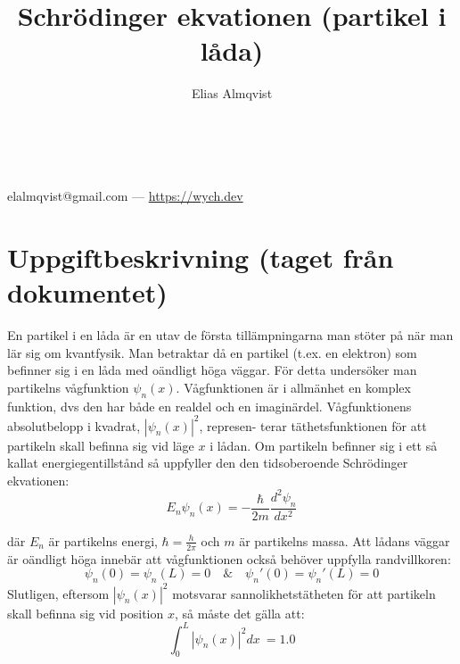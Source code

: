 \documentclass{article}
\makeatletter
\renewcommand{\maketitle}{
	\begin{center}
		{\huge\bfseries\thetitle}\\
		\vspace{1em}
		{\Large\theauthor} \\
		\vspace{1em}
		elalmqvist@gmail.com --- \url{https://wych.dev}
	\end{center}
}
\newcommand{\wavefun}{\psi_n(x)}
\newcommand{\shrodequ}{E_n \psi_n(x) = - \frac{\hbar}{2m} \frac{d^2 \psi_n}{dx^2}}
\newcommand{\shrodprob}{|\psi_n(x)|^2}
\makeatother
\begin{document}
\title{Schrödinger ekvationen (partikel i låda)}
\author{Elias Almqvist}

\maketitle
\newpage

\section{Uppgiftbeskrivning (taget från dokumentet)}
En partikel i en låda är en utav de första tillämpningarna man stöter på när man lär sig om kvantfysik. Man betraktar då en partikel (t.ex. en elektron) som befinner sig i en låda med oändligt höga väggar.
För detta undersöker man partikelns vågfunktion $\wavefun$. Vågfunktionen är i allmänhet en komplex funktion,
dvs den har både en realdel och en imaginärdel. Vågfunktionens absolutbelopp i kvadrat, $\shrodprob$, represen-
terar täthetsfunktionen för att partikeln skall befinna sig vid läge $x$ i lådan. Om partikeln befinner sig i ett så
kallat energiegentillstånd så uppfyller den den tidsoberoende Schrödinger ekvationen:
\begin{equation}
	\shrodequ
\end{equation}

där $E_n$ är partikelns energi, $\hbar = \frac{h}{2\pi}$ och $m$ är partikelns massa.
Att lådans väggar är oändligt höga innebär att vågfunktionen också behöver uppfylla randvillkoren:
$$
\psi_n(0) = \psi_n(L) = 0 \quad \& \quad \psi_n'(0) = \psi_n'(L) = 0 
$$
Slutligen, eftersom $\shrodprob$ motsvarar sannolikhetstätheten för att partikeln skall befinna sig vid position $x$, så måste det gälla att:
$$
\int_0^L \shrodprob dx\ = 1.0
$$
\end{document}
